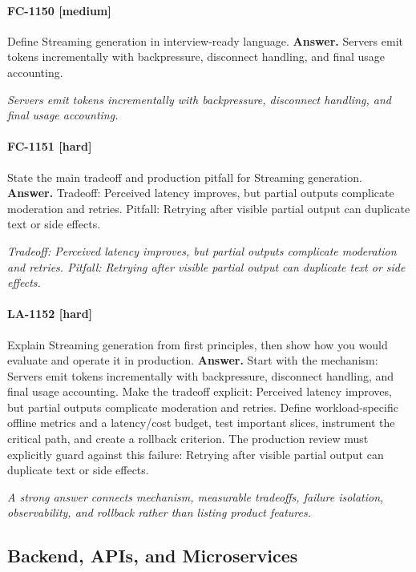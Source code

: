 \paragraph{FC-1150 [medium]} Define Streaming generation in interview-ready language.
\noindent\textbf{Answer.} Servers emit tokens incrementally with backpressure, disconnect handling, and final usage accounting.
\par\textit{Servers emit tokens incrementally with backpressure, disconnect handling, and final usage accounting.}
\paragraph{FC-1151 [hard]} State the main tradeoff and production pitfall for Streaming generation.
\noindent\textbf{Answer.} Tradeoff: Perceived latency improves, but partial outputs complicate moderation and retries. Pitfall: Retrying after visible partial output can duplicate text or side effects.
\par\textit{Tradeoff: Perceived latency improves, but partial outputs complicate moderation and retries. Pitfall: Retrying after visible partial output can duplicate text or side effects.}
\paragraph{LA-1152 [hard]} Explain Streaming generation from first principles, then show how you would evaluate and operate it in production.
\noindent\textbf{Answer.} Start with the mechanism: Servers emit tokens incrementally with backpressure, disconnect handling, and final usage accounting. Make the tradeoff explicit: Perceived latency improves, but partial outputs complicate moderation and retries. Define workload-specific offline metrics and a latency/cost budget, test important slices, instrument the critical path, and create a rollback criterion. The production review must explicitly guard against this failure: Retrying after visible partial output can duplicate text or side effects.
\par\textit{A strong answer connects mechanism, measurable tradeoffs, failure isolation, observability, and rollback rather than listing product features.}
\subsection{Backend, APIs, and Microservices}
